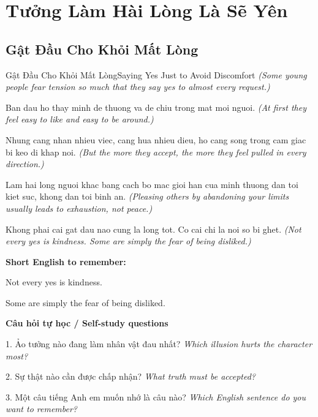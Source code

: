 \chapter{Tưởng Làm Hài Lòng Là Sẽ Yên}

\section{Gật Đầu Cho Khỏi Mất Lòng}
\begin{truyen}{Gật Đầu Cho Khỏi Mất Lòng}{Saying Yes Just to Avoid Discomfort}
\textit{(Some young people fear tension so much that they say yes to almost every request.)}

Ban dau ho thay minh de thuong va de chiu trong mat moi nguoi.
\textit{(At first they feel easy to like and easy to be around.)}

Nhung cang nhan nhieu viec, cang hua nhieu dieu, ho cang song trong cam giac bi keo di khap noi.
\textit{(But the more they accept, the more they feel pulled in every direction.)}

Lam hai long nguoi khac bang cach bo mac gioi han cua minh thuong dan toi kiet suc, khong dan toi binh an.
\textit{(Pleasing others by abandoning your limits usually leads to exhaustion, not peace.)}

\end{truyen}

\begin{baihoc}
Khong phai cai gat dau nao cung la long tot. Co cai chi la noi so bi ghet.
\textit{(Not every yes is kindness. Some are simply the fear of being disliked.)}
\end{baihoc}

\begin{ghinhoanh}
\textbf{Short English to remember:}

Not every yes is kindness.

Some are simply the fear of being disliked.

\end{ghinhoanh}

\begin{tuhocnhanh}
\textbf{Câu hỏi tự học / Self-study questions}

1. Ảo tưởng nào đang làm nhân vật đau nhất? \textit{Which illusion hurts the character most?}

2. Sự thật nào cần được chấp nhận? \textit{What truth must be accepted?}

3. Một câu tiếng Anh em muốn nhớ là câu nào? \textit{Which English sentence do you want to remember?}
\end{tuhocnhanh}
\ngancach


